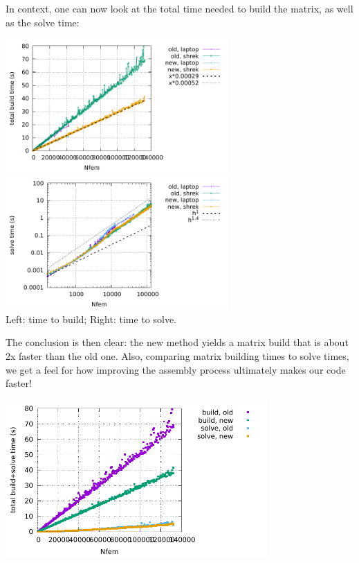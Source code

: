 In context, one can now look at the total time needed to build the matrix,
as well as the solve time:
\begin{center}
\includegraphics[width=8.5cm]{python_codes/fieldstone_176/results/build.pdf}
\includegraphics[width=8.5cm]{python_codes/fieldstone_176/results/solve.pdf}\\
{\captionfont Left: time to build; Right: time to solve.}
\end{center}
The conclusion is then clear: the new method yields a matrix build that 
is about 2x faster than the old one.
Also, comparing matrix building times to solve times, we get a feel for how 
improving the assembly process ultimately makes our code faster!
\begin{center}
\includegraphics[width=10cm]{python_codes/fieldstone_176/results/build_solve.pdf}
\end{center}

